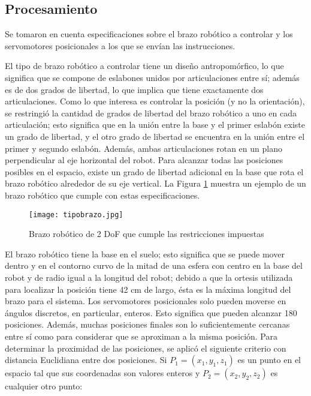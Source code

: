 \subsection{Procesamiento}

Se tomaron en cuenta especificaciones sobre el brazo robótico a controlar y los servomotores posicionales a los que se envían las instrucciones.

El tipo de brazo robótico a controlar tiene un diseño antropomórfico, lo que significa que se compone de eslabones unidos por articulaciones entre sí; además es de dos grados de libertad, lo que implica que tiene exactamente dos articulaciones. Como lo que interesa es controlar la posición (y no la orientación), se restringió la cantidad de grados de libertad del brazo robótico a uno en cada articulación; esto significa que en la unión entre la base y el primer eslabón existe un grado de libertad, y el otro grado de libertad se encuentra en la unión entre el primer y segundo eslabón. Además, ambas articulaciones rotan en un plano perpendicular al eje horizontal del robot. Para alcanzar todas las posiciones posibles en el espacio, existe un grado de libertad adicional en la base que rota el brazo robótico alrededor de su eje vertical. La Figura \ref{fig:tipobrazo} muestra un ejemplo de un brazo robótico que cumple con estas especificaciones.

\begin{figure}[htb]
	\centering
	\texttt{[image: tipobrazo.jpg]}
	\caption{Brazo robótico de 2 DoF que cumple las restricciones impuestas}
	\label{fig:tipobrazo}
\end{figure}

El brazo robótico tiene la base en el suelo; esto significa que se puede mover dentro y en el contorno curvo de la mitad de una esfera con centro en la base del robot y de radio igual a la longitud del robot; debido a que la ortesis utilizada para localizar la posición tiene 42 cm de largo, ésta es la máxima longitud del brazo para el sistema. Los servomotores posicionales solo pueden moverse en ángulos discretos, en particular, enteros. Esto significa que pueden alcanzar 180 posiciones. Además, muchas posiciones finales son lo suficientemente cercanas entre sí como para considerar que se aproximan a la misma posición.  Para determinar la proximidad de las posiciones, se aplicó el siguiente criterio con distancia Euclidiana entre dos posiciones. Si $P_1 = (x_1, y_1, z_1)$ es un punto en el espacio tal que sus coordenadas son valores enteros y $P_2 = (x_2, y_2, z_2)$ es cualquier otro punto:

